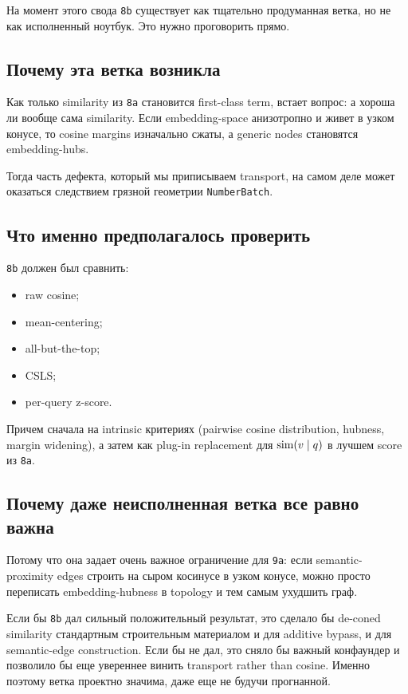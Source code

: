 На момент этого свода \texttt{8b} существует как тщательно продуманная ветка, но
не как исполненный ноутбук. Это нужно проговорить прямо.

\subsection{Почему эта ветка возникла}

Как только similarity из \texttt{8a} становится first-class term, встает вопрос:
а хороша ли вообще сама similarity. Если embedding-space анизотропно и живет в
узком конусе, то cosine margins изначально сжаты, а generic nodes становятся
embedding-hubs.

Тогда часть дефекта, который мы приписываем transport, на самом деле может
оказаться следствием грязной геометрии \texttt{NumberBatch}.

\subsection{Что именно предполагалось проверить}

\texttt{8b} должен был сравнить:

\begin{itemize}[leftmargin=2em]
\item raw cosine;
\item mean-centering;
\item all-but-the-top;
\item CSLS;
\item per-query z-score.
\end{itemize}

Причем сначала на intrinsic критериях (pairwise cosine distribution, hubness,
margin widening), а затем как plug-in replacement для \(\mathrm{sim}(v\mid q)\) в
лучшем score из \texttt{8a}.

\subsection{Почему даже неисполненная ветка все равно важна}

Потому что она задает очень важное ограничение для \texttt{9a}: если
semantic-proximity edges строить на сыром косинусе в узком конусе, можно просто
переписать embedding-hubness в topology и тем самым ухудшить граф.

\begin{openbox}
Если бы \texttt{8b} дал сильный положительный результат, это сделало бы
de-coned similarity стандартным строительным материалом и для additive bypass, и
для semantic-edge construction. Если бы не дал, это сняло бы важный конфаундер и
позволило бы еще увереннее винить transport rather than cosine. Именно поэтому
ветка проектно значима, даже еще не будучи прогнанной.
\end{openbox}

